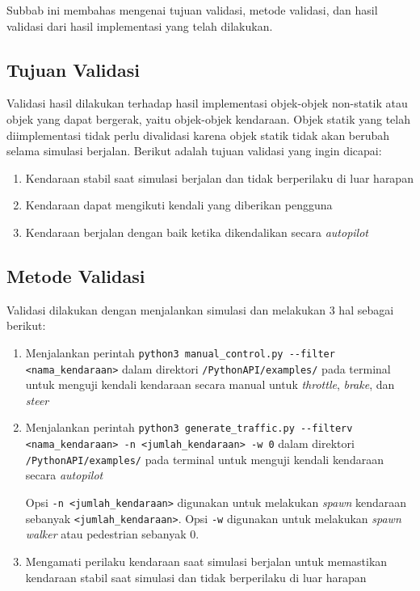 Subbab ini membahas mengenai tujuan validasi, metode validasi, dan hasil
validasi dari hasil implementasi yang telah dilakukan.

\subsection{Tujuan Validasi}

Validasi hasil dilakukan terhadap hasil implementasi objek-objek non-statik atau
objek yang dapat bergerak, yaitu objek-objek kendaraan. Objek statik yang telah
diimplementasi tidak perlu divalidasi karena objek statik tidak akan berubah
selama simulasi berjalan. Berikut adalah tujuan validasi yang ingin dicapai:

\begin{enumerate}
    \item Kendaraan stabil saat simulasi berjalan dan tidak berperilaku di luar
    harapan
    \item Kendaraan dapat mengikuti kendali yang diberikan pengguna
    \item Kendaraan berjalan dengan baik ketika dikendalikan secara
    \textit{autopilot}
\end{enumerate}

\subsection{Metode Validasi}

Validasi dilakukan dengan menjalankan simulasi dan melakukan 3 hal sebagai
berikut:

\begin{enumerate}

    \item Menjalankan perintah \verb|python3 manual_control.py --filter|
    \verb|<nama_kendaraan>| dalam direktori \verb|/PythonAPI/examples/| pada
    terminal untuk menguji kendali kendaraan secara manual untuk
    \textit{throttle}, \textit{brake}, dan \textit{steer}

    \item Menjalankan perintah \verb|python3 generate_traffic.py --filterv|
    \verb|<nama_kendaraan> -n <jumlah_kendaraan> -w 0| dalam direktori \verb|/PythonAPI/examples/|
    pada terminal untuk menguji kendali kendaraan secara \textit{autopilot}

    Opsi \verb|-n <jumlah_kendaraan>| digunakan untuk melakukan \textit{spawn}
    kendaraan sebanyak \verb|<jumlah_kendaraan>|. Opsi \verb|-w| digunakan untuk
    melakukan \textit{spawn} \textit{walker} atau pedestrian sebanyak 0.

    \item Mengamati perilaku kendaraan saat simulasi berjalan untuk memastikan
    kendaraan stabil saat simulasi dan tidak berperilaku di luar harapan

\end{enumerate}

